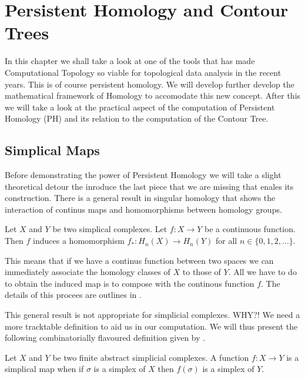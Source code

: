 \chapter{Persistent Homology and Contour Trees}
\label{chapter4}

In this chapter we shall take a look at one of the tools that has made Computational Topology so viable for topological data analysis in the recent years. This is of course persistent homology. We will develop further develop the mathematical framework of Homology to accomodate this new concept. After this we will take a look at the practical aspect of the computation of Persistent Homology (PH) and its relation to the computation of the Contour Tree.

\section{Simplical Maps}

Before demonstrating the power of Persistent Homology we will take a slight theoretical detour the inroduce the last piece that we are missing that enales its construction. There is a general result in singular homology that shows the interaction of continus maps and homomorphisms between homology groups.

\begin{defn} Let $X$ and $Y$ be two simplical complexes. Let $f: X \to Y$ be a continuous function. Then $f$ induces a homomorphism $f_*: H_n(X) \to H_n(Y)$ for all $n \in \{0, 1, 2, ...\}$. \end{defn}

This means that if we have a continus function between two spaces we can immediately associate the homology classes of $X$ to those of $Y$. All we have to do to obtain the induced map is to compose with the continous function $f$. The details of this procees are outlines in \cite{algebraic-topology}.


This general result is not appropriate for simplicial complexes. WHY?! We need a more tracktable definition to aid us in our computation. We will thus present the following combinatorially flavoured definition given by \cite{combinatorial-algebraic-topology}. 


\begin{defn} Let $X$ and $Y$ be two finite abstract simplicial complexes. A function $f: X \to Y$ is a simplical map when if $\sigma$ is a simplex of $X$ then $f(\sigma)$ is a simplex of $Y$. \end{defn}

